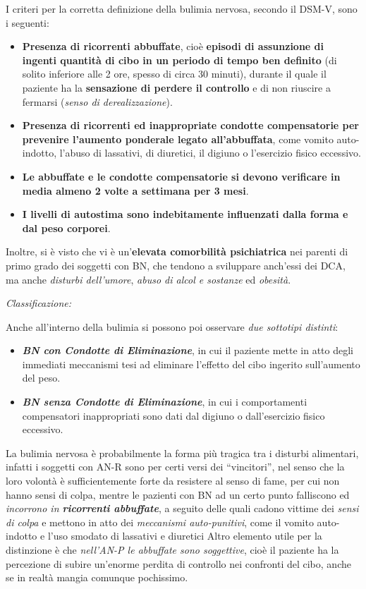 I criteri per la corretta definizione della bulimia nervosa, secondo il
DSM-V, sono i seguenti:

\begin{itemize}
\item
  \textbf{Presenza di ricorrenti abbuffate}, cioè \textbf{episodi di
  assunzione di ingenti quantità di cibo in un periodo di tempo ben
  definito} (di solito inferiore alle 2 ore, spesso di circa 30 minuti),
  durante il quale il paziente ha la \textbf{sensazione di perdere il
  controllo} e di non riuscire a fermarsi (\emph{senso di
  derealizzazione}).
\item
  \textbf{Presenza di ricorrenti ed inappropriate condotte compensatorie
  per prevenire l'aumento ponderale legato all'abbuffata}, come vomito
  auto-indotto, l'abuso di lassativi, di diuretici, il digiuno o
  l'esercizio fisico eccessivo.
\item
  \textbf{Le abbuffate e le condotte compensatorie si devono verificare
  in media almeno 2 volte a settimana per 3 mesi}.
\item
  \textbf{I livelli di autostima sono indebitamente influenzati dalla
  forma e dal peso corporei}.
\end{itemize}

Inoltre, si è visto che vi è un'\textbf{elevata comorbilità
psichiatrica} nei parenti di primo grado dei soggetti con BN, che
tendono a sviluppare anch'essi dei DCA, ma anche \emph{disturbi
dell'umore}, \emph{abuso di alcol e sostanze} ed \emph{obesità}.

\emph{\emph{Classificazione:}}

Anche all'interno della bulimia si possono poi osservare \emph{due
sottotipi distinti}:

\begin{itemize}
\item
  \textbf{\emph{BN con Condotte di Eliminazione}}, in cui il paziente
  mette in atto degli immediati meccanismi tesi ad eliminare l'effetto
  del cibo ingerito sull'aumento del peso.
\item
  \textbf{\emph{BN senza Condotte di Eliminazione}}, in cui i
  comportamenti compensatori inappropriati sono dati dal digiuno o
  dall'esercizio fisico eccessivo.
\end{itemize}

La bulimia nervosa è probabilmente la forma più tragica tra i disturbi
alimentari, infatti i soggetti con AN-R sono per certi versi dei
``vincitori'', nel senso che la loro volontà è sufficientemente forte da
resistere al senso di fame, per cui non hanno sensi di colpa, mentre le
pazienti con BN ad un certo punto falliscono ed \emph{incorrono in
\textbf{ricorrenti abbuffate}}, a seguito delle quali cadono vittime dei
\emph{sensi di colpa} e mettono in atto dei \emph{meccanismi
auto-punitivi}, come il vomito auto-indotto e l'uso smodato di lassativi
e diuretici Altro elemento utile per la distinzione è che
\emph{nell'AN-P le abbuffate sono soggettive}, cioè il paziente ha la
percezione di subire un'enorme perdita di controllo nei confronti del
cibo, anche se in realtà mangia comunque pochissimo.

